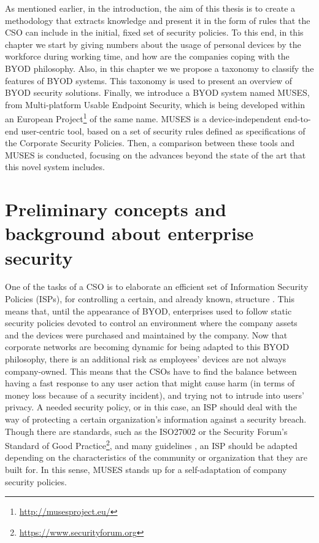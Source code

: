 As mentioned earlier, in the introduction, the aim of this thesis is to create a methodology that extracts knowledge and present it in the form of rules that the CSO can include in the initial, fixed set of security policies. To this end, in this chapter we start by giving numbers about the usage of personal devices by the workforce during working time, and how are the companies coping with the BYOD philosophy. Also, in this chapter we we propose a taxonomy to classify the features of BYOD systems. This taxonomy is used to present an overview of BYOD security solutions. Finally, we introduce a BYOD system named MUSES, from Multi-platform Usable Endpoint Security, which is being developed within an European Project\footnote{\url{http://musesproject.eu/}} of the same name. MUSES is a dev\-ice\--in\-de\-pen\-dent end-to-end user-centric tool, based on a set of security rules defined as specifications of the Corporate Security Policies. Then, a comparison between these tools and MUSES is conducted, focusing on the advances beyond the state of the art that this novel system includes.

\section{Preliminary concepts and background about enterprise security}
\label{sec:preliminaryconcepts}

One of the tasks of a CSO is to elaborate an efficient set of Information Security Policies (ISPs), for controlling a certain, and already known, structure \cite{Opp_Security11}. This means that, until the appearance of BYOD, enterprises used to follow static security policies devoted to control an environment where the company assets and the devices were purchased and maintained by the company. Now that corporate networks are becoming dynamic for being adapted to this BYOD philosophy, there is an additional risk as employees' devices are not always company-owned. This means that the CSOs have to find the balance between having a fast response to any user action that might cause harm (in terms of money loss because of a security incident), and trying not to intrude into users' privacy. A needed security policy, or in this case, an ISP should deal with the way of protecting a certain organization's information against a security breach. Though there are standards, such as the ISO27002 or the Security Forum's Standard of Good Practice\footnote{\url{https://www.securityforum.org}}, and many guidelines \cite{SecPol09}, an ISP should be adapted depending on the characteristics of the community or organization that they are built for. In this sense, MUSES stands up for a self-adaptation of company security policies.


